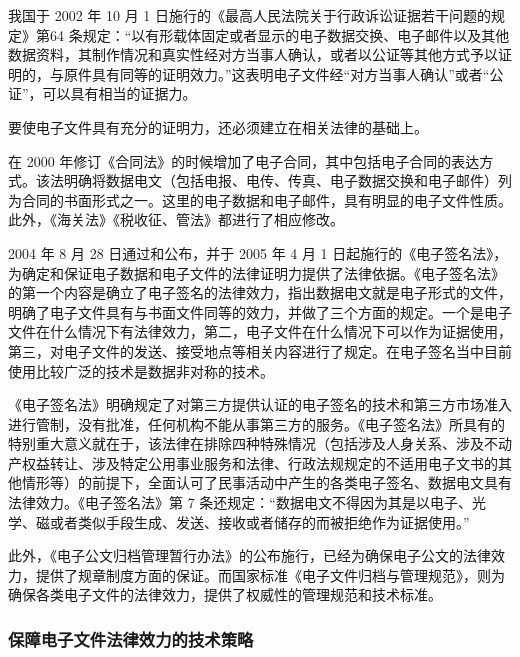     我国于 2002 年 10 月 1 日施行的《最高人民法院关于行政诉讼证据若干问题的规定》第64 条规定：“以有形载体固定或者显示的电子数据交换、电子邮件以及其他数据资料，其制作情况和真实性经对方当事人确认，或者以公证等其他方式予以证明的，与原件具有同等的证明效力。”这表明电子文件经“对方当事人确认”或者“公证”，可以具有相当的证据力。

    要使电子文件具有充分的证明力，还必须建立在相关法律的基础上。

    在 2000 年修订《合同法》的时候增加了电子合同，其中包括电子合同的表达方式。该法明确将数据电文（包括电报、电传、传真、电子数据交换和电子邮件）列为合同的书面形式之一。这里的电子数据和电子邮件，具有明显的电子文件性质。此外，《海关法》《税收征、管法》都进行了相应修改。

    2004 年 8 月 28 日通过和公布，并于 2005 年 4 月 1 日起施行的《电子签名法》，为确定和保证电子数据和电子文件的法律证明力提供了法律依据。《电子签名法》的第一个内容是确立了电子签名的法律效力，指出数据电文就是电子形式的文件，明确了电子文件具有与书面文件同等的效力，并做了三个方面的规定。一个是电子文件在什么情况下有法律效力，第二，电子文件在什么情况下可以作为证据使用，第三，对电子文件的发送、接受地点等相关内容进行了规定。在电子签名当中目前使用比较广泛的技术是数据非对称的技术。

    《电子签名法》明确规定了对第三方提供认证的电子签名的技术和第三方市场准入进行管制，没有批准，任何机构不能从事第三方的服务。《电子签名法》所具有的特别重大意义就在于，该法律在排除四种特殊情况（包括涉及人身关系、涉及不动产权益转让、涉及特定公用事业服务和法律、行政法规规定的不适用电子文书的其他情形等）的前提下，全面认可了民事活动中产生的各类电子签名、数据电文具有法律效力。《电子签名法》第 7 条还规定：“数据电文不得因为其是以电子、光学、磁或者类似手段生成、发送、接收或者储存的而被拒绝作为证据使用。”

    此外，《电子公文归档管理暂行办法》的公布施行，已经为确保电子公文的法律效力，提供了规章制度方面的保证。而国家标准《电子文件归档与管理规范》，则为确保各类电子文件的法律效力，提供了权威性的管理规范和技术标准。

    \subsubsection {保障电子文件法律效力的技术策略}

